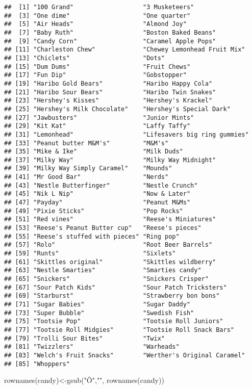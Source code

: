\documentclass[
]{article}
\newenvironment{Shaded}{\begin{snugshade}}{\end{snugshade}}
\newcommand{\FunctionTok}[1]{\textcolor[rgb]{0.00,0.00,0.00}{#1}}
\newcommand{\NormalTok}[1]{#1}
\newcommand{\OtherTok}[1]{\textcolor[rgb]{0.56,0.35,0.01}{#1}}
\newcommand{\StringTok}[1]{\textcolor[rgb]{0.31,0.60,0.02}{#1}}
\begin{document}
\begin{verbatim}
##  [1] "100 Grand"                   "3 Musketeers"               
##  [3] "One dime"                    "One quarter"                
##  [5] "Air Heads"                   "Almond Joy"                 
##  [7] "Baby Ruth"                   "Boston Baked Beans"         
##  [9] "Candy Corn"                  "Caramel Apple Pops"         
## [11] "Charleston Chew"             "Chewey Lemonhead Fruit Mix" 
## [13] "Chiclets"                    "Dots"                       
## [15] "Dum Dums"                    "Fruit Chews"                
## [17] "Fun Dip"                     "Gobstopper"                 
## [19] "Haribo Gold Bears"           "Haribo Happy Cola"          
## [21] "Haribo Sour Bears"           "Haribo Twin Snakes"         
## [23] "Hershey's Kisses"            "Hershey's Krackel"          
## [25] "Hershey's Milk Chocolate"    "Hershey's Special Dark"     
## [27] "Jawbusters"                  "Junior Mints"               
## [29] "Kit Kat"                     "Laffy Taffy"                
## [31] "Lemonhead"                   "Lifesavers big ring gummies"
## [33] "Peanut butter M&M's"         "M&M's"                      
## [35] "Mike & Ike"                  "Milk Duds"                  
## [37] "Milky Way"                   "Milky Way Midnight"         
## [39] "Milky Way Simply Caramel"    "Mounds"                     
## [41] "Mr Good Bar"                 "Nerds"                      
## [43] "Nestle Butterfinger"         "Nestle Crunch"              
## [45] "Nik L Nip"                   "Now & Later"                
## [47] "Payday"                      "Peanut M&Ms"                
## [49] "Pixie Sticks"                "Pop Rocks"                  
## [51] "Red vines"                   "Reese's Miniatures"         
## [53] "Reese's Peanut Butter cup"   "Reese's pieces"             
## [55] "Reese's stuffed with pieces" "Ring pop"                   
## [57] "Rolo"                        "Root Beer Barrels"          
## [59] "Runts"                       "Sixlets"                    
## [61] "Skittles original"           "Skittles wildberry"         
## [63] "Nestle Smarties"             "Smarties candy"             
## [65] "Snickers"                    "Snickers Crisper"           
## [67] "Sour Patch Kids"             "Sour Patch Tricksters"      
## [69] "Starburst"                   "Strawberry bon bons"        
## [71] "Sugar Babies"                "Sugar Daddy"                
## [73] "Super Bubble"                "Swedish Fish"               
## [75] "Tootsie Pop"                 "Tootsie Roll Juniors"       
## [77] "Tootsie Roll Midgies"        "Tootsie Roll Snack Bars"    
## [79] "Trolli Sour Bites"           "Twix"                       
## [81] "Twizzlers"                   "Warheads"                   
## [83] "Welch's Fruit Snacks"        "Werther's Original Caramel" 
## [85] "Whoppers"
\end{verbatim}

\begin{Shaded}
\begin{Highlighting}[]
\FunctionTok{rownames}\NormalTok{(candy)}\OtherTok{\textless{}{-}}\FunctionTok{gsub}\NormalTok{(}\StringTok{"Õ"}\NormalTok{,}\StringTok{"\textquotesingle{}"}\NormalTok{, }\FunctionTok{rownames}\NormalTok{(candy))}
\end{Highlighting}
\end{Shaded}
\end{document}
